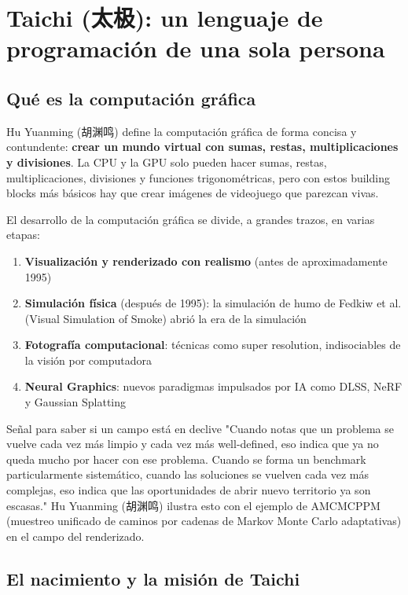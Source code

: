 \section{Taichi (太极): un lenguaje de programación de una sola persona}

\subsection{Qué es la computación gráfica}

Hu Yuanming (胡渊鸣) define la computación gráfica de forma concisa y contundente: \textbf{crear un mundo virtual con sumas, restas, multiplicaciones y divisiones}. La CPU y la GPU solo pueden hacer sumas, restas, multiplicaciones, divisiones y funciones trigonométricas, pero con estos building blocks más básicos hay que crear imágenes de videojuego que parezcan vivas.

El desarrollo de la computación gráfica se divide, a grandes trazos, en varias etapas:

\begin{enumerate}
\item \textbf{Visualización y renderizado con realismo} (antes de aproximadamente 1995)
\item \textbf{Simulación física} (después de 1995): la simulación de humo de Fedkiw et al. (Visual Simulation of Smoke) abrió la era de la simulación
\item \textbf{Fotografía computacional}: técnicas como super resolution, indisociables de la visión por computadora
\item \textbf{Neural Graphics}: nuevos paradigmas impulsados por IA como DLSS, NeRF y Gaussian Splatting
\end{enumerate}

\begin{knowledgebox}{Señal para saber si un campo está en declive}
"Cuando notas que un problema se vuelve cada vez más limpio y cada vez más well-defined, eso indica que ya no queda mucho por hacer con ese problema. Cuando se forma un benchmark particularmente sistemático, cuando las soluciones se vuelven cada vez más complejas, eso indica que las oportunidades de abrir nuevo territorio ya son escasas." Hu Yuanming (胡渊鸣) ilustra esto con el ejemplo de AMCMCPPM (muestreo unificado de caminos por cadenas de Markov Monte Carlo adaptativas) en el campo del renderizado.
\end{knowledgebox}

\subsection{El nacimiento y la misión de Taichi}

